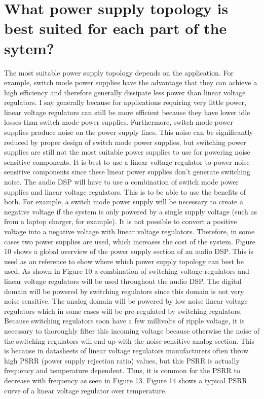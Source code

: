         \section{What power supply topology is best suited for each part of the sytem?}
        The most suitable power supply topology depends on the application. For example, switch mode power supplies have the advantage that they can achieve a high efficiency and therefore generally dissipate less power than linear voltage regulators. I say generally because for applications requiring very little power, linear voltage regulators can still be more efficient because they have lower idle losses than switch mode power supplies.
Furthermore, switch mode power supplies produce noise on the power supply lines. This noise can be significantly reduced by proper design of switch mode power supplies, but switching power supplies are still not the most suitable power supplies to use for powering noise sensitive components.
It is best to use a linear voltage regulator to power noise-sensitive components since these linear power supplies don't generate switching noise. The audio DSP will have to use a combination of switch mode power supplies and linear voltage regulators. This is to be able to use the benefits of both.
For example, a switch mode power supply will be necessary to create a negative voltage if the system is only powered by a single supply voltage (such as from a laptop charger, for example). It is not possible to convert a positive voltage into a negative voltage with linear voltage regulators. Therefore, in some cases two power supplies are used, which increases the cost of the system.
Figure 10 shows a global overview of the power supply section of an audio DSP. This is used as an reference to show where which power supply topology can best be used. As shown in Figure 10 a combination of switching voltage regulators and linear voltage regulators will be used throughout the audio DSP. The digital domain will be powered by switching regulators since this domain is not very noise sensitive. The analog domain will be powered by low noise linear voltage regulators which in some cases will be pre-regulated by switching regulators.\\
Because switching regulators soon have a few millivolts of ripple voltage, it is necessary to thoroughly filter this incoming voltage because otherwise the noise of the switching regulators will end up with the noise sensitive analog section. This is because in datasheets of linear voltage regulators manufacturers often throw high PSRR (power supply rejection ratio) values, but this PSRR is actually frequency and temperature dependent. Thus, it is common for the PSRR to decrease with frequency as seen in Figure 13. Figure 14 shows a typical PSRR curve of a linear voltage regulator over temperature.\\
